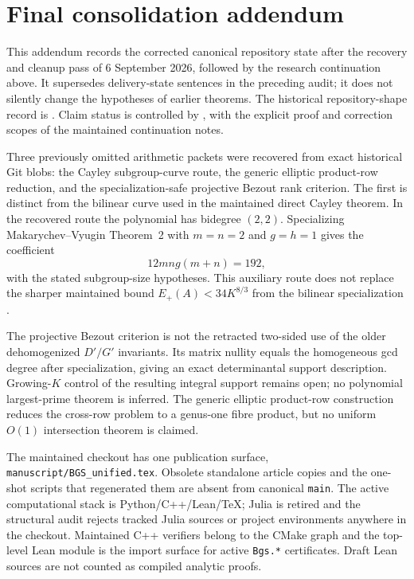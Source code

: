 \section{Final consolidation addendum}
\label{sec:final-consolidation-addendum}
This addendum records the corrected canonical repository state after the
recovery and cleanup pass of 6 September 2026, followed by the research
continuation above. It supersedes delivery-state sentences in the preceding
audit; it does not silently change the hypotheses of earlier theorems.
The historical repository-shape record is
.
Claim status is controlled by , with the
explicit proof and correction scopes of the maintained continuation notes.

Three previously omitted arithmetic packets were recovered from exact
historical Git blobs: the Cayley subgroup-curve route, the generic elliptic
product-row reduction, and the specialization-safe projective Bezout rank
criterion. The first is distinct from the bilinear curve used in the
maintained direct Cayley theorem. In the recovered route the polynomial has
bidegree $(2,2)$. Specializing Makarychev--Vyugin Theorem~2 with $m=n=2$ and
$g=h=1$ gives the coefficient
\[
 12mng(m+n)=192,
\]
with the stated subgroup-size hypotheses. This auxiliary route does not
replace the sharper maintained bound $E_+(A)<34K^{8/3}$ from the bilinear
specialization \cite{VM2015,MV2019}.

The projective Bezout criterion is not the retracted two-sided use of the older
dehomogenized $D'/G'$ invariants. Its matrix nullity equals the homogeneous
gcd degree after specialization, giving an exact determinantal support
description. Growing-$K$ control of the resulting integral support remains
open; no polynomial largest-prime theorem is inferred. The generic elliptic
product-row construction reduces the cross-row problem to a genus-one fibre
product, but no uniform $O(1)$ intersection theorem is claimed.

The maintained checkout has one publication surface,
\texttt{manuscript/BGS\_unified.tex}. Obsolete standalone article copies and
the one-shot scripts that regenerated them are absent from canonical
\texttt{main}. The active computational stack is Python/C++/Lean/TeX; Julia is
retired and the structural audit rejects tracked Julia sources or project
environments anywhere in the checkout. Maintained C++ verifiers belong to
the CMake graph and the top-level Lean module is the import surface for
active \texttt{Bgs.*} certificates. Draft Lean sources are not counted as
compiled analytic proofs.

